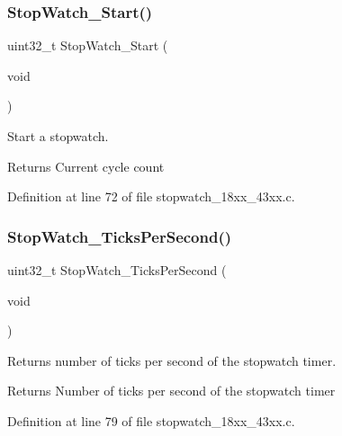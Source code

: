 \subsubsection{\texorpdfstring{Stop\+Watch\+\_\+\+Start()}{StopWatch\_Start()}}
{\footnotesize\ttfamily uint32\+\_\+t Stop\+Watch\+\_\+\+Start (\begin{DoxyParamCaption}\item[{void}]{ }\end{DoxyParamCaption})}



Start a stopwatch. 

\begin{DoxyReturn}{Returns}
Current cycle count 
\end{DoxyReturn}


Definition at line 72 of file stopwatch\+\_\+18xx\+\_\+43xx.\+c.

\mbox{\label{group___stop___watch_gae780d65d75ed3ca6dbd33389479eed9f}} 
\subsubsection{\texorpdfstring{Stop\+Watch\+\_\+\+Ticks\+Per\+Second()}{StopWatch\_TicksPerSecond()}}
{\footnotesize\ttfamily uint32\+\_\+t Stop\+Watch\+\_\+\+Ticks\+Per\+Second (\begin{DoxyParamCaption}\item[{void}]{ }\end{DoxyParamCaption})}



Returns number of ticks per second of the stopwatch timer. 

\begin{DoxyReturn}{Returns}
Number of ticks per second of the stopwatch timer 
\end{DoxyReturn}


Definition at line 79 of file stopwatch\+\_\+18xx\+\_\+43xx.\+c.

\mbox{\label{group___stop___watch_gab62ee68f7b01b5c14b0d19c3c391ca02}} 
